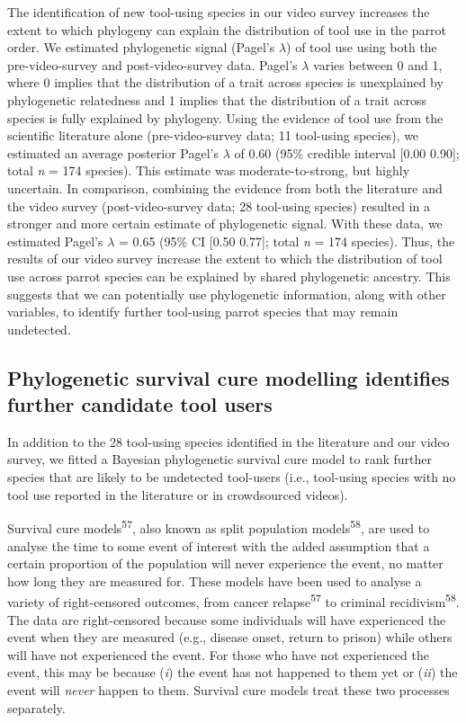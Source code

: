 \documentclass[
  man,floatsintext]{apa6}
\begin{document}
The identification of new tool-using species in our video survey increases the
extent to which phylogeny can explain the distribution of tool use in the parrot
order. We estimated phylogenetic signal (Pagel's \(\lambda\)) of tool use using
both the pre-video-survey and post-video-survey data. Pagel's \(\lambda\) varies
between 0 and 1, where 0 implies that the distribution of a trait across species
is unexplained by phylogenetic relatedness and 1 implies that the distribution
of a trait across species is fully explained by phylogeny. Using the evidence of
tool use from the scientific literature alone (pre-video-survey data; 11
tool-using species), we estimated an average posterior Pagel's \(\lambda\) of
0.60 (95\% credible interval {[}0.00
0.90{]}; total \emph{n} =
174 species). This estimate was moderate-to-strong, but highly
uncertain. In comparison, combining the evidence from both the literature and
the video survey (post-video-survey data; 28 tool-using species) resulted in a
stronger and more certain estimate of phylogenetic signal. With these data, we
estimated Pagel's \(\lambda\) = 0.65 (95\% CI
{[}0.50
0.77{]}; total \emph{n} =
174 species). Thus, the results of our video survey increase
the extent to which the distribution of tool use across parrot species can be
explained by shared phylogenetic ancestry. This suggests that we can potentially
use phylogenetic information, along with other variables, to identify further
tool-using parrot species that may remain undetected.

\hypertarget{phylogenetic-survival-cure-modelling-identifies-further-candidate-tool-users}{%
\subsection{Phylogenetic survival cure modelling identifies further candidate tool users}\label{phylogenetic-survival-cure-modelling-identifies-further-candidate-tool-users}}

In addition to the 28 tool-using species identified in the literature and our
video survey, we fitted a Bayesian phylogenetic survival cure model to rank
further species that are likely to be undetected tool-users (i.e., tool-using
species with no tool use reported in the literature or in crowdsourced videos).

Survival cure models\textsuperscript{57}, also known as split population
models\textsuperscript{58}, are used to analyse the time to some event of interest
with the added assumption that a certain proportion of the population will never
experience the event, no matter how long they are measured for. These models
have been used to analyse a variety of right-censored outcomes, from cancer
relapse\textsuperscript{57} to criminal recidivism\textsuperscript{58}. The data are
right-censored because some individuals will have experienced the event when
they are measured (e.g., disease onset, return to prison) while others will have
not experienced the event. For those who have not experienced the event, this
may be because (\emph{i}) the event has not happened to them yet or (\emph{ii}) the event
will \emph{never} happen to them. Survival cure models treat these two processes
separately.
\end{document}
